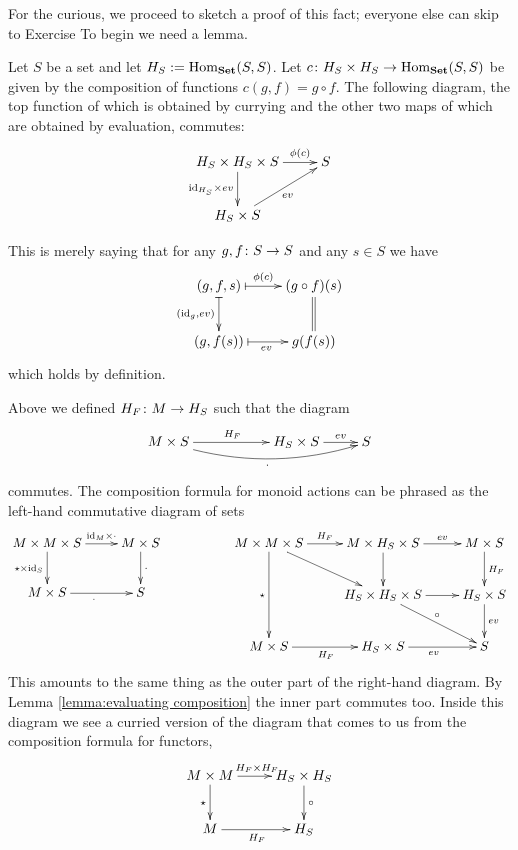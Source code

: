 \documentclass[CT4S-EN-RU]{subfiles}
\begin{document}
\begin{blockENG}
For the curious, we proceed to sketch a proof of this fact; everyone else can skip to Exercise %
To begin we need a lemma.
\end{blockENG}

\begin{blockRUS}
\end{blockRUS}

\begin{lemmaENG}\label{lemma:evaluating composition}
Let $S$ be a set and let $H_S:=\textnormal{Hom}_{\bf Set}(S,S)$. Let $c\colon H_S\times H_S\rightarrow\textnormal{Hom}_{\bf Set}(S,S)$ be given by the composition of functions $c(g,f)=g\circ f$. The following diagram, the top function of which is obtained by currying and the other two maps of which are obtained by evaluation, commutes: 
$$
\xymatrix{H_S\times H_S\times S\ar[r]^-{\phi(c)}\ar[d]_{\id_{H_S}\times ev}&S\\H_S\times S\ar[ur]_{ev}}
$$
\end{lemmaENG}

\begin{lemmaRUS}\label{lemma:evaluating composition}
\end{lemmaRUS}

\begin{proofENG}
This is merely saying that for any $g,f\colon S\rightarrow S$ and any $s\in S$ we have 
$$
\xymatrix{(g,f,s)\ar@{|->}[r]^-{\phi(c)}\ar@{|->}[d]_{(\id_g,ev)}&(g\circ f)(s)\ar@{=}[d]\\(g,f(s))\ar@{|->}[r]_{ev}&g(f(s))}
$$
which holds by definition.
\end{proofENG}

\begin{proofRUS}
\end{proofRUS}

\begin{blockENG}
Above we defined $H_F\colon M\rightarrow H_S$ such that the diagram 
$$
\xymatrix{M\times S\ar[rr]^{H_F}\ar@/_1pc/[rrr]_{\cdot}&&H_S\times S\ar[r]^-{ev}&S}
$$
commutes. The composition formula for monoid actions can be phrased as the left-hand commutative diagram of sets
$$
\xymatrix{M\times M\times S\ar[r]^-{\id_M\times\cdot}\ar[d]_{\star\times\id_S}&M\times S\ar[d]^\cdot\\M\times S\ar[r]_\cdot&S}
\hspace{.7in}
\xymatrix@=25pt{
M\times M\times S\ar[rd]\ar[r]^-{H_F}\ar[dd]_{\star}&M\times H_S\times S\ar[d]\ar[r]^-{ev}&M\times S\ar[d]^{H_F}\\
&H_S\times H_S\times S\ar[r]\ar[rd]^\circ&H_S\times S\ar[d]^{ev}\\
M\times S\ar[r]_{H_F}&H_S\times S\ar[r]_{ev}&S}
$$
This amounts to the same thing as the outer part of the right-hand diagram. By Lemma \ref{lemma:evaluating composition} the inner part commutes too. Inside this diagram we see a curried version of the diagram that comes to us from the composition formula for functors,
$$
\xymatrix{M\times M\ar[r]^{H_F\times H_F}\ar[d]_\star&H_S\times H_S\ar[d]^\circ\\M\ar[r]_{H_F}&H_S}
$$
\end{blockENG}
\end{document}

